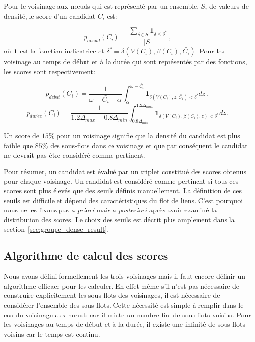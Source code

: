 Pour le voisinage aux n\oe uds qui est représenté par un ensemble, $S$, de valeurs de densité, le score d'un candidat $C_i$ est:

\begin{equation}
p_{noeud}(C_i)= \dfrac{\sum_{\delta \in S} \mathbf{1}_{\delta \le \delta^*}}{|S|}\,,
\end{equation}
où $\mathbf{1}$ est la fonction indicatrice et $\delta^* =\delta(V(C_i),\beta(C_i), \bar{C_i})$.
Pour les voisinage au temps de début et à la durée qui sont représentés par des fonctions, les scores sont respectivement:

\begin{equation}
p_{d\acute{e}but}(C_i)=\dfrac{1}{\omega-\bar{C_i} - \alpha} \int_{\alpha}^{\omega- \bar{C_i}} \mathbf{1}_{\delta(V(C_i),z,\bar{C_i}) <\delta^*} dz \ ,
\end{equation} 
\begin{equation}
p_{dur\acute{e}e}(C_i)=\dfrac{1}{1.2\Delta_{max} - 0.8\Delta_{min}} \int_{0.8\Delta_{min}}^{1.2\Delta_{max}} \mathbf{1}_{\delta(V(C_i),\beta(C_i),z) <\delta^*} dz \, .
\end{equation}

Un score de $15\%$ pour un voisinage signifie que la densité du candidat est plus faible que $85\%$ des sous-flots dans ce voisinage et que par conséquent le candidat ne devrait pas être considéré comme pertinent.

\bigskip
Pour résumer, un candidat est évalué par un triplet constitué des scores obtenus pour chaque voisinage.
Un candidat est considéré comme pertinent si tous ces scores sont plus élevés que des seuils définis manuellement.
La définition de ces seuils est difficile et dépend des caractéristiques du flot de liens.
C'est pourquoi nous ne les fixons pas \emph{a priori} mais \emph{a posteriori} après avoir examiné la distribution des scores.
Le choix des seuils est décrit plus amplement dans la section~\ref{sec:groupe_dense_result}.

\subsection{Algorithme de calcul des scores}
Nous avons défini formellement les trois voisinages mais il faut encore définir un algorithme efficace pour les calculer.
En effet même s'il n'est pas nécessaire de construire explicitement les sous-flots des voisinages, il est nécessaire de considérer l'ensemble des sous-flots.
Cette nécessité est simple à remplir dans le cas du voisinage aux n\oe uds car il existe un nombre fini de sous-flots voisins.
Pour les voisinages au temps de début et à la durée, il existe une infinité de sous-flots voisins car le temps est continu.

